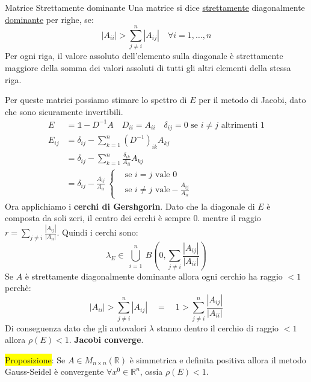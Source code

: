 \documentclass{article}
\begin{document}
\begin{defi}{Matrice Strettamente dominante}{}
    Una matrice si dice \underline{strettamente} diagonalmente \underline{dominante} per righe, se:
    \[|A_{ii}|>\sum_{j\ne i}^n\left|A_{ij}\right|\quad\forall i=1,\dots,n\]
    Per ogni riga, il valore assoluto dell'elemento sulla diagonale è strettamente maggiore della somma dei valori assoluti di tutti gli altri elementi della stessa riga.
\end{defi}

Per queste matrici possiamo stimare lo spettro di $E$ per il metodo di Jacobi, dato che sono sicuramente invertibili.
\begin{align*}
    E      & =\mathbb 1-D^{-1}A\quad D_{ii}=A_{ii}\quad \delta_{ij}=0\text{ se }i\ne j\text{ altrimenti $1$}                                      \\
    E_{ij} & =\delta_{ij}-\sum_{k=1}^{n}\left(D^{-1}\right)_{ik}A_{kj}                                                                            \\
           & =\delta_{ij}-\sum_{k=1}^{n}\frac{\delta_{ik}}{A_{ii}}A_{kj}                                                                          \\
           & =\delta_{ij}-\frac{A_{ij}}{A_{ii}}\ \begin{cases}
                                                      & \text{se $i=j$ vale $0$}                      \\
                                                      & \text{se $i\ne j$ vale}-\frac{A_{ij}}{A_{ii}}
                                                 \end{cases}
\end{align*}
Ora applichiamo i \textbf{cerchi di Gershgorin}. Dato che la diagonale di $E$ è composta da soli zeri, il centro dei cerchi è sempre $0$.
mentre il raggio $r =\underset{j \neq i}{\sum} \frac{\left|A_{ij}\right|}{\left|A_{ii}\right|}$. Quindi i cerchi sono:
\[\lambda_E\in\ \bigcup_{i=1}^n\ B\left(0, \sum_{j\ne i}\frac{\left|A_{ij}\right|}{\left|A_{ii}\right|}\right)\]
Se $A$ è strettamente diagonalmente dominante allora ogni cerchio ha raggio $<1$ perchè:
\[\left|A_{ii}\right|>\sum_{j\ne i}^{n}\left|A_{ij}\right|\quad =\quad 1>\sum_{j\ne i}^{n}\frac{\left|A_{ij}\right|}{\left|A_{ii}\right|} \]
Di conseguenza dato che gli autovalori $\lambda$ stanno dentro il cerchio di raggio $<1$ allora $\rho(E)<1$. \textbf{Jacobi converge}.

\colorbox{yellow}{Proposizione}: Se $A\in M_{n\times n}(\mathbb R)$ è simmetrica e definita positiva allora il metodo Gauss-Seidel è convergente $\forall x^0\in\mathbb R^n$, ossia $\rho(E)<1$.
\end{document}
